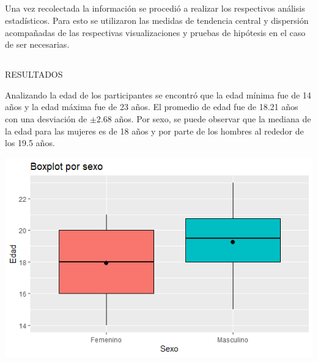 \documentclass{beamer}
\begin{document}
\subsection{}
\begin{frame}{}
\vspace{-0.9\baselineskip}
\begin{tcolorbox}[colback=backframe_color,colframe=beamer_color,title= Técnicas: Análisis Univariado y Bivariado] 
Una vez recolectada la información se procedió a realizar los respectivos análisis estadísticos. Para esto se utilizaron las medidas de tendencia central y dispersión acompañadas de las respectivas visualizaciones y pruebas de hipótesis en el caso de ser necesarias.  
    
\end{tcolorbox}
\end{frame}



\subsection{}
\begin{frame}{RESULTADOS}
\vspace{-0.9\baselineskip}
\begin{tcolorbox}[colback=backframe_color,colframe=beamer_color,title= ] 
Analizando la edad de los participantes se encontró que la edad mínima fue de 14 años y la edad máxima fue de 23 años. El promedio de edad fue de 18.21 años con una desviación de $\pm 2.68$ años. Por sexo,  se puede observar que la mediana de la edad para las mujeres es de 18 años y por parte de los hombres al rededor de los 19.5 años.


\includegraphics[width=0.65\linewidth]{special_figures/Rplot.png}
    
\end{tcolorbox}
\end{frame}
\end{document}

